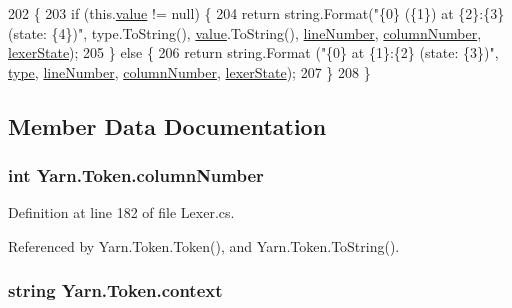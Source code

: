 \begin{DoxyCode}
202                                           \{
203             \textcolor{keywordflow}{if} (this.\hyperlink{a00163_a3df6b32d6190a639619a3f064c2154e2}{value} != null) \{
204                 \textcolor{keywordflow}{return} string.Format(\textcolor{stringliteral}{"\{0\} (\{1\}) at \{2\}:\{3\} (state: \{4\})"}, type.ToString(), 
      \hyperlink{a00163_a3df6b32d6190a639619a3f064c2154e2}{value}.ToString(), \hyperlink{a00163_a80fe710713201bb793a41452e314a721}{lineNumber}, \hyperlink{a00163_a9a0f0a8a7ab1e90ab48f15192323ffca}{columnNumber}, 
      \hyperlink{a00163_a710099e7abe84f30864a320cc7464214}{lexerState});
205             \} \textcolor{keywordflow}{else} \{
206                 \textcolor{keywordflow}{return} string.Format (\textcolor{stringliteral}{"\{0\} at \{1\}:\{2\} (state: \{3\})"}, \hyperlink{a00163_a471a25da67fda0524f2375f9a882aafa}{type}, 
      \hyperlink{a00163_a80fe710713201bb793a41452e314a721}{lineNumber}, \hyperlink{a00163_a9a0f0a8a7ab1e90ab48f15192323ffca}{columnNumber}, \hyperlink{a00163_a710099e7abe84f30864a320cc7464214}{lexerState});
207             \}
208         \}
\end{DoxyCode}


\subsection{Member Data Documentation}
\hypertarget{a00163_a9a0f0a8a7ab1e90ab48f15192323ffca}{
\subsubsection[{column\-Number}]{\setlength{\rightskip}{0pt plus 5cm}int Yarn.\-Token.\-column\-Number}}\label{a00163_a9a0f0a8a7ab1e90ab48f15192323ffca}


Definition at line 182 of file Lexer.\-cs.



Referenced by Yarn.\-Token.\-Token(), and Yarn.\-Token.\-To\-String().

\hypertarget{a00163_a089d248c904a6e8366b81c2c47ff5af8}{
\subsubsection[{context}]{\setlength{\rightskip}{0pt plus 5cm}string Yarn.\-Token.\-context}}\label{a00163_a089d248c904a6e8366b81c2c47ff5af8}



